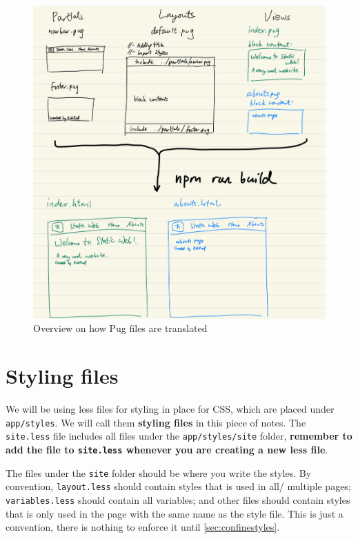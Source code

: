 \begin{figure}[h]
\centering
\includegraphics[width=15cm]{images/ch4-puglayouts.png}
\caption{Overview on how Pug files are translated}
\label{fig:puglayouts}
\end{figure}

\section{Styling files}
\label{sec:lesslayout}

We will be using less files for styling in place for CSS, which are placed under \texttt{app/styles}. We will call them \textbf{styling files} in this piece of notes. The \texttt{site.less} file includes all files under the \texttt{app/styles/site} folder, \textbf{remember to add the file to \texttt{site.less} whenever you are creating a new less file}. 

The files under the \texttt{site} folder should be where you write the styles. By convention, \texttt{layout.less} should contain styles that is used in all/ multiple pages; \texttt{variables.less} should contain all variables; and other files should contain styles that is only used in the page with the same name as the style file. This is just a convention, there is nothing to enforce it until \cref{sec:confinestyles}.

